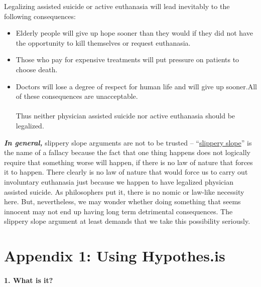 \documentclass[12pt, openany]{book}
\providecommand{\tightlist}{%
  \setlength{\itemsep}{0pt}\setlength{\parskip}{0pt}}
\begin{document}
\begin{center}

\begin{argument}

Legalizing assisted suicide or active euthanasia will lead inevitably to the following consequences:\\

\begin{itemize}
\tightlist
\item
  Elderly people will give up hope sooner than they would if they did not have the opportunity to kill themselves or request euthanasia.
\item
  Those who pay for expensive treatments will put pressure on patients to choose death.
\item
  Doctors will lose a degree of respect for human life and will give up sooner.All of these consequences are unacceptable.\\
  ~\\
  Thus neither physician assisted suicide nor active euthanasia should be legalized.
\end{itemize}

\end{argument}

\end{center}

\textbf{\emph{In general,}} slippery slope arguments are not to be trusted -- ``\protect\hyperlink{slippery-slope}{slippery slope}'' is the name of a fallacy because the fact that one thing happens does not logically require that something worse will happen, if there is no law of nature that forces it to happen. There clearly is no law of nature that would force us to carry out involuntary euthanasia just because we happen to have legalized physician assisted suicide. As philosophers put it, there is no nomic or law-like necessity here. But, nevertheless, we may wonder whether doing something that seems innocent may not end up having long term detrimental consequences. The slippery slope argument at least demands that we take this possibility seriously.

\hypertarget{appendix-1}{%
\chapter*{Appendix 1: Using Hypothes.is}\label{appendix-1}}


\hypertarget{what-is-it}{%
\subsubsection*{1. What is it?}\label{what-is-it}}
\end{document}
